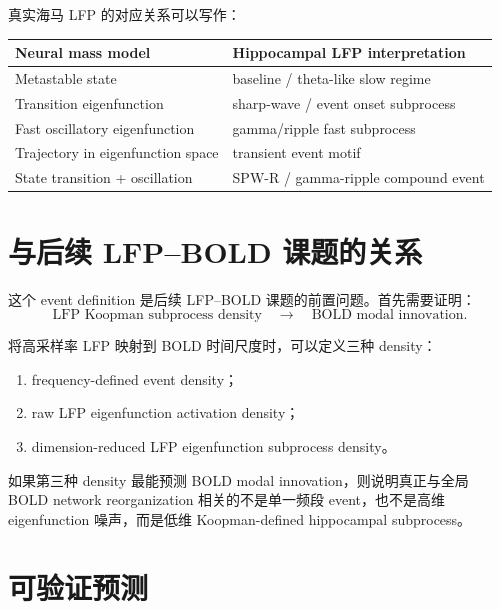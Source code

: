 \documentclass[11pt,a4paper]{ctexart}
\begin{document}
真实海马 LFP 的对应关系可以写作：
\begin{center}
\begin{tabular}{ll}
\toprule
Neural mass model & Hippocampal LFP interpretation \\
\midrule
Metastable state & baseline / theta-like slow regime \\
Transition eigenfunction & sharp-wave / event onset subprocess \\
Fast oscillatory eigenfunction & gamma/ripple fast subprocess \\
Trajectory in eigenfunction space & transient event motif \\
State transition + oscillation & SPW-R / gamma-ripple compound event \\
\bottomrule
\end{tabular}
\end{center}

\section{与后续 LFP--BOLD 课题的关系}

这个 event definition 是后续 LFP--BOLD 课题的前置问题。首先需要证明：
\begin{equation}
\text{LFP Koopman subprocess density}
\quad\rightarrow\quad
\text{BOLD modal innovation}.
\end{equation}

将高采样率 LFP 映射到 BOLD 时间尺度时，可以定义三种 density：
\begin{enumerate}[leftmargin=2em]
    \item frequency-defined event density；
    \item raw LFP eigenfunction activation density；
    \item dimension-reduced LFP eigenfunction subprocess density。
\end{enumerate}

如果第三种 density 最能预测 BOLD modal innovation，则说明真正与全局 BOLD network reorganization 相关的不是单一频段 event，也不是高维 eigenfunction 噪声，而是低维 Koopman-defined hippocampal subprocess。

\section{可验证预测}
\end{document}
